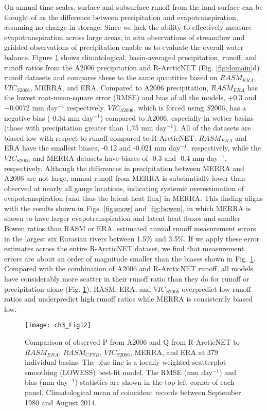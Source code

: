 On annual time scales, surface and subsurface runoff from the land surface can be thought of as the difference between precipitation and evapotranspiration, assuming no change in storage.
Since we lack the ability to effectively measure evapotranspiration across large areas, in situ observations of streamflow and gridded observations of precipitation enable us to evaluate the overall water balance.
Figure \ref{fig:streamflow_scatter} shows climatological, basin-averaged precipitation, runoff, and runoff ratios from the A2006 precipitation and R-ArcticNET (Fig. \ref{fig:domain}d) runoff datasets and compares these to the same quantities based on $RASM_{ERA}$, $VIC_{S2006}$, MERRA, and ERA.
Compared to A2006 precipitation, $RASM_{ERA}$ has the lowest root-mean-square error (RMSE) and bias of all the models, +0.3 and +0.0072 mm day$^{-1}$ respectively.
$VIC_{S2006}$, which is forced using $S2006$, has a negative bias (-0.34 mm day$^{-1}$) compared to A2006, especially in wetter basins (those with precipitation greater than 1.75 mm day$^{-1}$).
All of the datasets are biased low with respect to runoff compared to R-ArcticNET.
$RASM_{ERA}$ and ERA have the smallest biases, -0.12 and -0.021 mm day$^{-1}$, respectively, while the $VIC_{S2006}$ and MERRA datasets have biases of -0.3 and -0.4 mm day$^{-1}$, respectively.
Although the differences in precipitation between MERRA and A2006 are not large, annual runoff from MERRA is substantially lower than observed at nearly all gauge locations, indicating systemic overestimation of evapotranspiration (and thus the latent heat flux) in MERRA.
This finding aligns with the results shown in Figs. \ref{fig:snow} and \ref{fig:bowen}, in which MERRA is shown to have larger evapotranspiration and latent heat fluxes and smaller Bowen ratios than RASM or ERA.
\citet{Shiklomanov_2006} estimated annual runoff measurement errors in the largest six Eurasian rivers between 1.5\% and 3.5\%.
If we apply these error estimates across the entire R-ArcticNET dataset, we find that measurement errors are about an order of magnitude smaller than the biases shown in Fig. \ref{fig:streamflow_scatter}.
Compared with the combination of A2006 and R-ArcticNET runoff, all models have considerably more scatter in their runoff ratio than they do for runoff or precipitation alone (Fig. \ref{fig:streamflow_scatter}).
RASM, ERA, and $VIC_{S2006}$ overpredict low runoff ratios and underpredict high runoff ratios while MERRA is consistently biased low.


\begin{figure}
  \centering
  \texttt{[image: ch3\_Fig12]}
  \caption{Comparison of observed P from A2006 and Q from R-ArcticNET to $RASM_{ERA}$, $RASM_{CFSR}$, $VIC_{S2006}$, MERRA, and ERA at 379 individual basins.
  The blue line is a locally weighted scatterplot smoothing (LOWESS) best-fit model.
  The RMSE (mm day$^{-1}$) and bias (mm day$^{-1}$) statistics are shown in the top-left corner of each panel.
  Climatological mean of coincident records between September 1980 and August 2014.}
  \label{fig:streamflow_scatter}
\end{figure}

